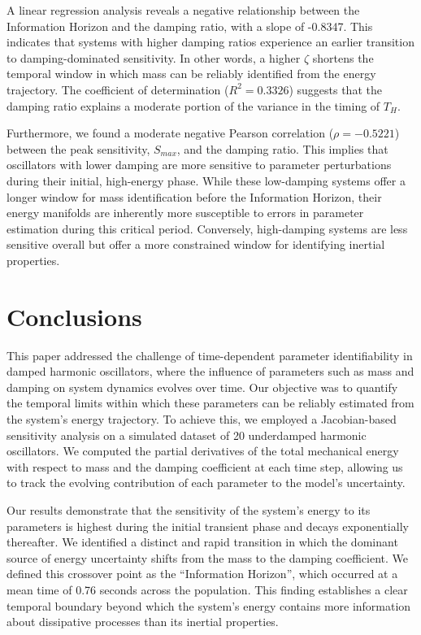 \documentclass[]{article}
\begin{document}
A linear regression analysis reveals a negative relationship between the Information Horizon and the damping ratio, with a slope of -0.8347. This indicates that systems with higher damping ratios experience an earlier transition to damping-dominated sensitivity. In other words, a higher $\zeta$ shortens the temporal window in which mass can be reliably identified from the energy trajectory. The coefficient of determination ($R^2 = 0.3326$) suggests that the damping ratio explains a moderate portion of the variance in the timing of $T_H$.

Furthermore, we found a moderate negative Pearson correlation ($\rho = -0.5221$) between the peak sensitivity, $S_{max}$, and the damping ratio. This implies that oscillators with lower damping are more sensitive to parameter perturbations during their initial, high-energy phase. While these low-damping systems offer a longer window for mass identification before the Information Horizon, their energy manifolds are inherently more susceptible to errors in parameter estimation during this critical period. Conversely, high-damping systems are less sensitive overall but offer a more constrained window for identifying inertial properties.

\section{Conclusions}
\label{sec:conclusions}


This paper addressed the challenge of time-dependent parameter identifiability in damped harmonic oscillators, where the influence of parameters such as mass and damping on system dynamics evolves over time. Our objective was to quantify the temporal limits within which these parameters can be reliably estimated from the system's energy trajectory. To achieve this, we employed a Jacobian-based sensitivity analysis on a simulated dataset of 20 underdamped harmonic oscillators. We computed the partial derivatives of the total mechanical energy with respect to mass and the damping coefficient at each time step, allowing us to track the evolving contribution of each parameter to the model's uncertainty.

Our results demonstrate that the sensitivity of the system's energy to its parameters is highest during the initial transient phase and decays exponentially thereafter. We identified a distinct and rapid transition in which the dominant source of energy uncertainty shifts from the mass to the damping coefficient. We defined this crossover point as the ``Information Horizon'', which occurred at a mean time of 0.76 seconds across the population. This finding establishes a clear temporal boundary beyond which the system's energy contains more information about dissipative processes than its inertial properties.
\end{document}
